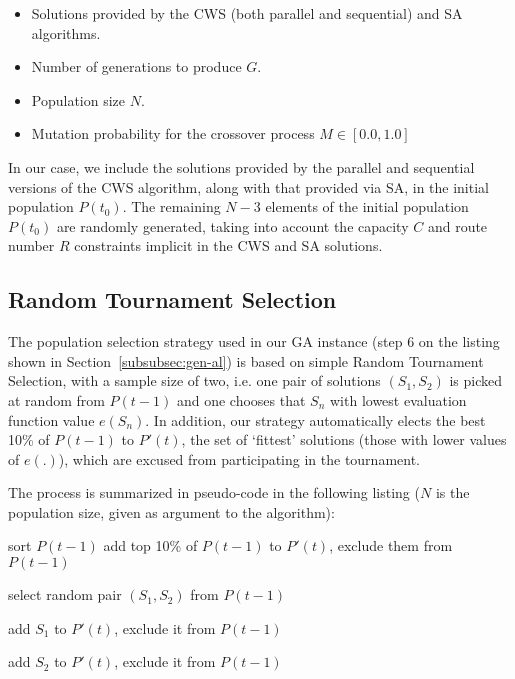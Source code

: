 \begin{itemize}
    \item Solutions provided by the CWS (both parallel and sequential) and SA 
            algorithms.
    \item Number of generations to produce $G$.
    \item Population size $N$.
    \item Mutation probability for the crossover process $M \in [0.0, 1.0]$
\end{itemize}\vertbreak

In our case, we include the solutions provided 
by the parallel and sequential versions of the CWS algorithm, along with that 
provided via SA, in the initial population $P(t_0)$. The remaining $N - 3$ 
elements of the initial population $P(t_0)$ are randomly generated, taking into 
account the capacity $C$ and route number $R$ constraints implicit in the CWS and 
SA solutions.

\subsection{Random Tournament Selection}
\label{subsec:random-tournament}

The population selection strategy used in our GA instance (step 6 on the listing 
shown in Section~\ref{subsubsec:gen-al}) is based on simple 
Random Tournament Selection, with a sample size of two, i.e. one pair of 
solutions $(S_1,S_2)$ is picked at random from $P(t - 1)$ and one chooses that 
$S_n$ with lowest evaluation function value $e(S_n)$. In addition, our strategy 
automatically elects the best 10\% of $P(t - 1)$ to $P'(t)$, the set of `fittest' 
solutions (those with lower values of $e(.)$), which are excused from 
participating in the tournament.\vertbreak 

The process is summarized in pseudo-code in the following listing ($N$ is the 
population size, given as argument to the algorithm):\vertbreak

\begin{algorithmic}[1]

\State sort $P(t - 1)$
\State add top 10\% of $P(t - 1)$ to $P'(t)$, 
\Statex[1] exclude them from $P(t - 1)$


    \Repeat
        \State select random pair $(S_1,S_2)$ from $P(t - 1)$


        \State add $S_1$ to $P'(t)$, exclude it from $P(t - 1)$


        \State add $S_2$ to $P'(t)$, exclude it from $P(t - 1)$

    \EndIf

\EndWhile

\end{algorithmic}\vertbreak

